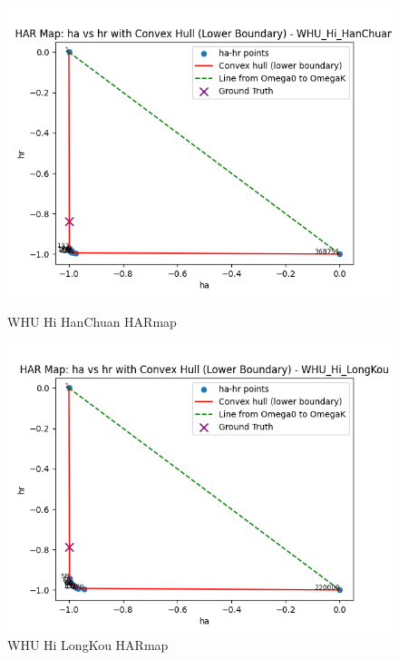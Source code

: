 \newpage
\begin{figure}[htbp]
    \centering
    \begin{minipage}{0.45\textwidth}
        \centering
        \includegraphics[width=\linewidth]{figures/WHU_Hi_HanChuan_HARmap.png}
        \caption{WHU Hi HanChuan HARmap}
        \label{fig:whu_hanchuan_har}
    \end{minipage}\hfill
    \begin{minipage}{0.45\textwidth}
        \centering
        \includegraphics[width=\linewidth]{figures/WHU_Hi_LongKou_HARmap.png}
        \caption{WHU Hi LongKou HARmap}
        \label{fig:whu_longkou_har}
    \end{minipage}
\end{figure}